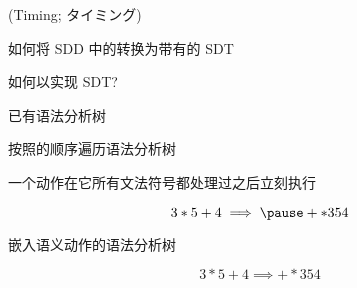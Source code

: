 \begin{frame}{}
  \begin{center}
     (Timing; タイミング)


    \vspace{0.30cm}
  \end{center}
\end{frame}

\begin{frame}{}
  \begin{center}
     如何将 SDD 中的转换为带有的 SDT

    \vspace{0.60cm}
    

    \vspace{0.60cm}
     如何以实现 SDT?
  \end{center}
\end{frame}

\begin{frame}{}
  \begin{center}
     已有语法分析树

    \vspace{0.50cm}

    \vspace{0.50cm}
    按照的顺序遍历语法分析树

    \pause
    \vspace{0.50cm}
     一个动作在它所有文法符号都处理过之后立刻执行
  \end{center}
\end{frame}

\begin{frame}{}
  \begin{center}
    \vspace{-0.50cm}
    \[
      3 \ast 5 + 4 \implies \pause + \ast 3 5 4
    \]
  \end{center}
\end{frame}

\begin{frame}{}
  \begin{center}
    嵌入语义动作的语法分析树

    \[
      3 \ast 5 + 4 \implies + \ast 3 5 4
    \]
  \end{center}
\end{frame}

